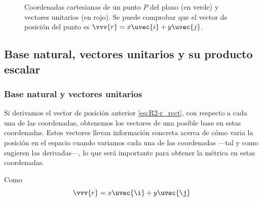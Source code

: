 \begin{figure}[ht]
  \caption{Coordenadas cartesianas de un punto $P$ del plano (en verde) y vectores
    unitarios (en rojo). Se puede comprobar que el vector de posición del punto es
    $\vvv{r} = x\uvec{i} + y\uvec{j}$.}
  \label{fig:R2-coord_rect-ij}
\end{figure}


\subsection{Base natural, vectores unitarios y su producto escalar}
\subsubsection{Base natural y vectores unitarios}
Si derivamos el vector de posición anterior \eqref{eq:R2-r_rect}, con respecto a
cada una de las coordenadas, obtenemos los vectores de una  posible base en estas
coordenadas. Estos vectores llevan información concreta acerca de cómo varia la posición
en el espacio cuando variamos cada una de las coordenadas ---tal y como sugieren las
derivadas---, lo que será importante para obtener la métrica en estas coordenadas.

Como
\begin{equation}
  \vvv{r} = x\uvec{\i} + y\uvec{\j}
\end{equation}

